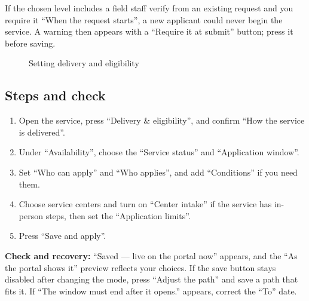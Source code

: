 \begin{rcwarn}
If the chosen level includes a field staff verify from an existing request and you require it “When the request starts”, a new applicant could never begin the service. A warning then appears with a “Require it at submit” button; press it before saving.
\end{rcwarn}

\begin{figure}[H]
\centering
{}
\rclegend
\caption{Setting delivery and eligibility}
\label{fig:builder-services-delivery-flow}
\end{figure}

\subsection{Steps and check}
\begin{enumerate}
\item Open the service, press “Delivery \& eligibility”, and confirm “How the service is delivered”.
\item Under “Availability”, choose the “Service status” and “Application window”.
\item Set “Who can apply” and “Who applies”, and add “Conditions” if you need them.
\item Choose service centers and turn on “Center intake” if the service has in-person steps, then set the “Application limits”.
\item Press “Save and apply”.
\end{enumerate}

\textbf{Check and recovery:} “Saved — live on the portal now” appears, and the “As the portal shows it” preview reflects your choices. If the save button stays disabled after changing the mode, press “Adjust the path” and save a path that fits it. If “The window must end after it opens.” appears, correct the “To” date.

